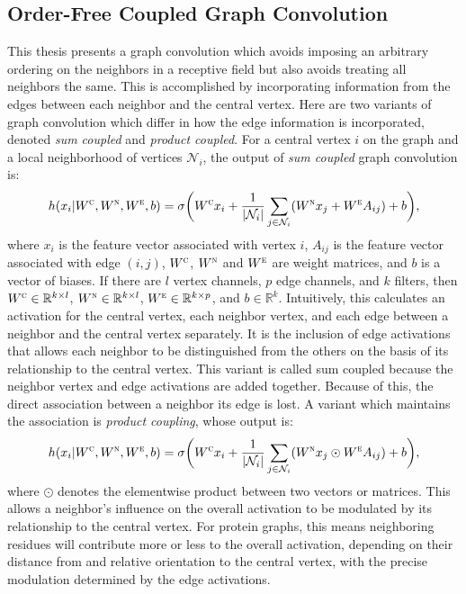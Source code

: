 \subsection{Order-Free Coupled Graph Convolution}
This thesis presents a graph convolution which avoids imposing an arbitrary ordering on the neighbors in a receptive field but also avoids treating all neighbors the same.
This is accomplished by incorporating information from the edges between each neighbor and the central vertex.
Here are two variants of graph convolution which differ in how the edge information is incorporated, denoted \textit{sum coupled} and \textit{product coupled}.
For a central vertex $i$ on the graph and a local neighborhood of vertices $\mathcal{N}_i$, the output of \emph{sum coupled} graph convolution is:
\begin{equation}
h(x_i | W^\textsc{c}, W^\textsc{n}, W^\textsc{e}, b) = \sigma \bigg( W^{\textsc{c}} x_i + \frac{1}{|\mathcal{N}_i|}\sum_{j \in \mathcal{N}_i} (W^{\textsc{n}} x_j + W^{\textsc{e}} A_{ij}) + b \bigg),
\label{eq:sum_coupling}
\end{equation}
where $x_i$ is the feature vector associated with vertex $i$, $A_{ij}$ is the feature vector associated with edge $(i, j)$, $W^\textsc{c}$, $W^\textsc{n}$ and $W^\textsc{e}$ are weight matrices, and $b$ is a vector of biases. 
If there are $l$ vertex channels, $p$ edge channels, and $k$ filters, then $W^\textsc{c}\in\mathbb{R}^{k \times l}$, $W^\textsc{n}\in\mathbb{R}^{k \times l}$, $W^\textsc{e}\in\mathbb{R}^{k \times p}$, and $b\in\mathbb{R}^{k}$.
Intuitively, this calculates an activation for the central vertex, each neighbor vertex, and each edge between a neighbor and the central vertex separately.
It is the inclusion of edge activations that allows each neighbor to be distinguished from the others on the basis of its relationship to the central vertex.
This variant is called sum coupled because the neighbor vertex and edge activations are added together.
Because of this, the direct association between a neighbor its edge is lost.
A variant which maintains the association is \emph{product coupling}, whose output is:
\begin{equation}
h(x_i | W^\textsc{c}, W^\textsc{n}, W^\textsc{e}, b) = \sigma \bigg( W^{\textsc{c}} x_i + \frac{1}{|\mathcal{N}_i|}\sum_{j \in \mathcal{N}_i} (W^{\textsc{n}} x_j \odot W^{\textsc{e}} A_{ij}) + b \bigg),
\label{eq:prod_coupling}
\end{equation}
where $\odot$ denotes the elementwise product between two vectors or matrices. 
This allows a neighbor's influence on the overall activation to be modulated by its relationship to the central vertex.
For protein graphs, this means neighboring residues will contribute more or less to the overall activation, depending on their distance from and relative orientation to the central vertex, with the precise modulation determined by the edge activations.

